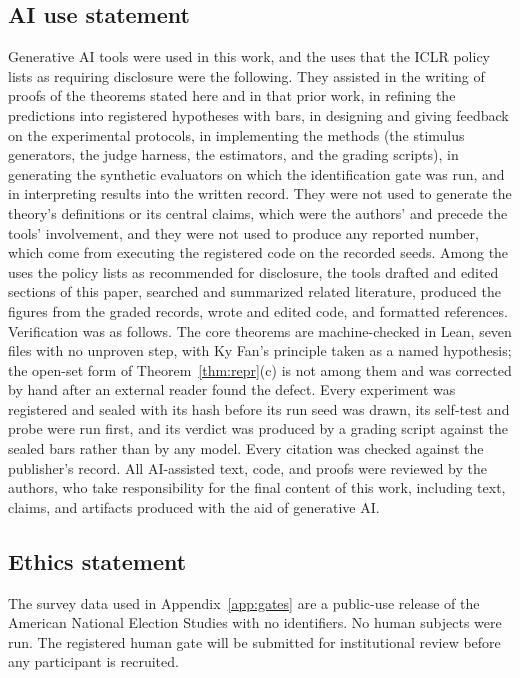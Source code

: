 \documentclass{article}
\theoremstyle{definition}
\theoremstyle{remark}
\begin{document}
\subsection*{AI use statement}
Generative AI tools were used in this work, and the uses that the ICLR policy lists as requiring disclosure were the following.
They assisted in the writing of proofs of the theorems stated here and in that prior work, in refining the predictions into registered hypotheses with bars, in designing and giving feedback on the experimental protocols, in implementing the methods (the stimulus generators, the judge harness, the estimators, and the grading scripts), in generating the synthetic evaluators on which the identification gate was run, and in interpreting results into the written record.
They were not used to generate the theory's definitions or its central claims, which were the authors' and precede the tools' involvement, and they were not used to produce any reported number, which come from executing the registered code on the recorded seeds.
Among the uses the policy lists as recommended for disclosure, the tools drafted and edited sections of this paper, searched and summarized related literature, produced the figures from the graded records, wrote and edited code, and formatted references.
Verification was as follows.
The core theorems are machine-checked in Lean, seven files with no unproven step, with Ky Fan's principle taken as a named hypothesis; the open-set form of Theorem~\ref{thm:repr}(c) is not among them and was corrected by hand after an external reader found the defect.
Every experiment was registered and sealed with its hash before its run seed was drawn, its self-test and probe were run first, and its verdict was produced by a grading script against the sealed bars rather than by any model.
Every citation was checked against the publisher's record.
All AI-assisted text, code, and proofs were reviewed by the authors, who take responsibility for the final content of this work, including text, claims, and artifacts produced with the aid of generative AI.

\subsection*{Ethics statement}
The survey data used in Appendix~\ref{app:gates} are a public-use release of the American National Election Studies with no identifiers.
No human subjects were run.
The registered human gate will be submitted for institutional review before any participant is recruited.
\end{document}
